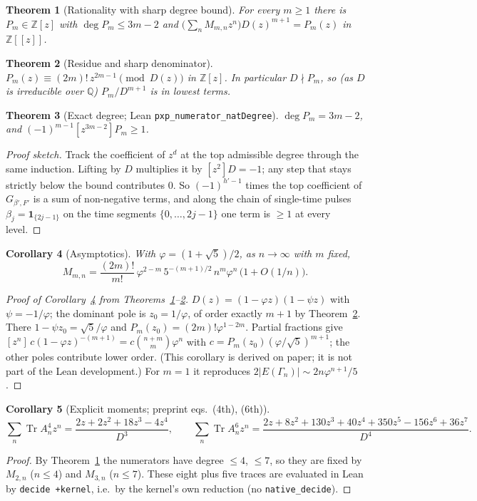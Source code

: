 \documentclass[10pt,a4paper]{article}
\newtheorem{theorem}{Theorem}
\newtheorem{corollary}[theorem]{Corollary}
\theoremstyle{remark}\newtheorem{remark}[theorem]{Remark}
\newcommand{\Tr}{\operatorname{Tr}}
\begin{document}
\begin{theorem}[Rationality with sharp degree bound]\label{thm:A}
For every $m\ge1$ there is $P_m\in\mathbb Z[z]$ with $\deg P_m\le 3m-2$ and $\bigl(\sum_nM_{m,n}z^n\bigr)D(z)^{m+1}=P_m(z)$ in $\mathbb Z[[z]]$.
\end{theorem}
\begin{theorem}[Residue and sharp denominator]\label{thm:B}
$P_m(z)\equiv(2m)!\,z^{2m-1}\pmod{D(z)}$ in $\mathbb Z[z]$. In particular $D\nmid P_m$, so (as $D$ is irreducible over $\mathbb Q$) $P_m/D^{m+1}$ is in lowest terms.
\end{theorem}
\begin{theorem}[Exact degree; Lean \texttt{pxp\_numerator\_natDegree}]\label{thm:C}
$\deg P_m=3m-2$, and $(-1)^{m-1}[z^{3m-2}]P_m\ge1$.
\end{theorem}
\begin{proof}[Proof sketch]
Track the coefficient of $z^{d}$ at the top admissible degree through the same induction. Lifting by $D$ multiplies it by $[z^2]D=-1$; any step that stays strictly below the bound contributes $0$. So $(-1)^{h'-1}$ times the top coefficient of $G_{\beta',F'}$ is a sum of non-negative terms, and along the chain of single-time pulses $\beta_j=\mathbf 1_{\{2j-1\}}$ on the time segments $\{0,\dots,2j-1\}$ one term is $\ge1$ at every level.
\end{proof}
\begin{corollary}[Asymptotics]\label{cor:asym}
With $\varphi=(1+\sqrt5)/2$, as $n\to\infty$ with $m$ fixed,
\[M_{m,n}=\frac{(2m)!}{m!}\,\varphi^{2-m}\,5^{-(m+1)/2}\,n^m\varphi^n\,\bigl(1+O(1/n)\bigr).\]
\end{corollary}
\begin{proof}[Proof of Corollary~\ref{cor:asym} from Theorems~\ref{thm:A}--\ref{thm:B}]
$D(z)=(1-\varphi z)(1-\psi z)$ with $\psi=-1/\varphi$; the dominant pole is $z_0=1/\varphi$, of order exactly $m+1$ by Theorem~\ref{thm:B}. There $1-\psi z_0=\sqrt5/\varphi$ and $P_m(z_0)=(2m)!\varphi^{1-2m}$. Partial fractions give $[z^n]\,c(1-\varphi z)^{-(m+1)}=c\binom{n+m}{m}\varphi^n$ with $c=P_m(z_0)(\varphi/\sqrt5)^{m+1}$; the other poles contribute lower order. (This corollary is derived on paper; it is not part of the Lean development.) For $m=1$ it reproduces $2|E(\Gamma_n)|\sim 2n\varphi^{n+1}/5$.
\end{proof}
\begin{corollary}[Explicit moments; preprint eqs.\ (4th), (6th)]
\[\sum_n\Tr A_n^4z^n=\frac{2z+2z^2+18z^3-4z^4}{D^3},\qquad
\sum_n\Tr A_n^6z^n=\frac{2z+8z^2+130z^3+40z^4+350z^5-156z^6+36z^7}{D^4}.\]
\end{corollary}
\begin{proof}
By Theorem~\ref{thm:A} the numerators have degree $\le4$, $\le7$, so they are fixed by $M_{2,n}$ ($n\le4$) and $M_{3,n}$ ($n\le7$). These eight plus five traces are evaluated in Lean by \texttt{decide +kernel}, i.e.\ by the kernel's own reduction (no \texttt{native\_decide}).
\end{proof}
\end{document}
